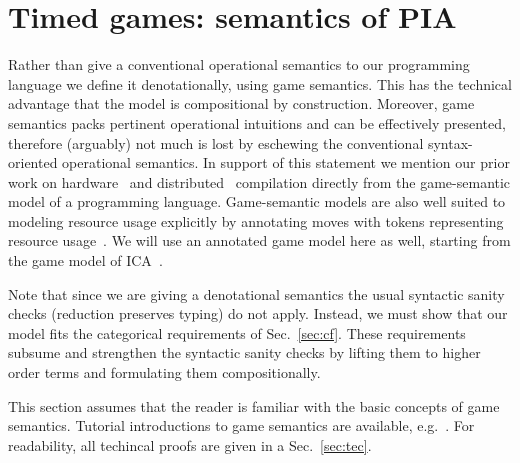 \documentclass{article}
\begin{document}
\section{Timed games: semantics of PIA}\label{sec:gamhort}
Rather than give a conventional operational semantics to our programming language we define it denotationally, using game semantics. This has the technical advantage that the model is compositional by construction. Moreover, game semantics packs pertinent operational intuitions and can be effectively presented, therefore (arguably) not much is lost by eschewing the conventional syntax-oriented operational semantics. In support of this statement we mention our prior work on hardware~\cite{DBLP:conf/mpc/Ghica12} and distributed~\cite{fredrikssong13} compilation directly from the game-semantic model of a programming language. 
Game-semantic models are also well suited to modeling resource usage
explicitly by annotating moves with tokens representing resource
usage~\cite{DBLP:conf/popl/Ghica05}. We will use an annotated game
model here as well, starting from the game model of
ICA~\cite{DBLP:journals/apal/GhicaM08}. 

Note that since we are giving a denotational semantics the usual syntactic sanity checks (reduction preserves typing) do not apply. Instead, we must show that our model fits the categorical requirements of Sec.~\ref{sec:cf}. These requirements subsume and strengthen the syntactic sanity checks by lifting them to higher order terms and formulating them compositionally. 

This section assumes that the reader is familiar with the basic concepts of game
semantics. Tutorial introductions to game semantics are available, e.g.~\cite{DBLP:conf/lics/Ghica09}. 
For readability, all techincal proofs are given in a Sec.~\ref{sec:tec}.
\end{document}

